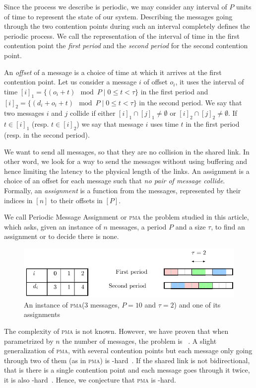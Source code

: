 \documentclass[10pt, conference, letterpaper]{IEEEtran}
\newcommand\pma{\textsc{pma}\xspace}
\begin{document}
Since the process we describe is periodic, we may consider any interval of $P$ units of time
to represent the state of our system. Describing the messages going through the two contention points during such an interval
completely defines the periodic process. We call the representation of the interval
of time in the first contention point the \emph{first period} and the \emph{second period}
for the second contention point.

An \emph{offset} of a message is a choice of time at which it arrives
at the first contention point. Let us consider a message $i$
of offset $o_i$, it uses the interval of time $[i]_1 = \{ (o_i + t) \mod P \mid 0 \leq t < \tau \}$ in the first period and $[i]_2 = \{ (d_i + o_i + t) \mod P \mid 0 \leq t < \tau \}$ in the second period. We say that two messages $i$ and $j$ collide if either $[i]_1 \cap [j]_1 \neq \emptyset $ or $[i]_2 \cap [j]_2 \neq \emptyset $. If $t \in [i]_1$ (resp. $t \in [i]_2$) we say that message $i$ uses time $t$ in the first period (resp. in the second period).

We want to send all messages, so that they are no collision in the shared link.
In other word, we look for a way to send the messages without using buffering and 
hence limiting the latency to the physical length of the links. An assignment is a
choice of an offset for each message such that \emph{no pair of message collide}.
Formally, an \emph{assignment} is a function from the messages, represented by their indices in $[n]$ to their offsets in $[P]$.  

We call Periodic Message Assignment or \pma the problem studied in this article,
which asks, given an instance of $n$ messages, a period $P$ and a size $\tau$, to find 
an assignment or to decide there is none.
\begin{figure}
\begin{center}
\includegraphics[scale=0.7]{instance}
\end{center}
\caption{An instance of \pma ($3$ messages, $P= 10$ and $\tau = 2$) and one of its assignments}
\end{figure}

The complexity of \pma is not known. However, we have proven that when parametrized by
$n$ the number of messages, the problem is \FPT~\cite{barth2018deterministic}.
A slight generalization of \pma, with several contention points but each message only going through two of them (as in \pma) is \NP-hard~\cite{barth2018deterministic}. If the shared link is not bidirectional, that is there is a single contention point and each message goes through it twice, it is also \NP-hard~\cite{orman1997complexity}. Hence, we conjecture that \pma is \NP-hard.
\end{document}
